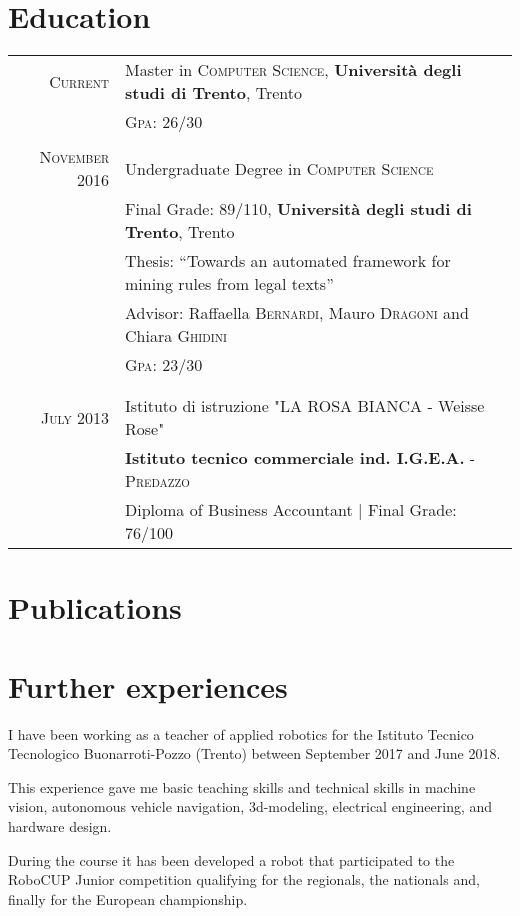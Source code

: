 \documentclass[a4paper,10pt]{article}
\begin{document}
\section{Education}
\begin{longtable}{rl}	
 \textsc{Current} & Master in \textsc{Computer Science}, \textbf{Università degli studi di Trento}, Trento\\
&\normalsize \textsc{Gpa}: 26/30{\hfill }\\&\\
\textsc{November} 2016 & Undergraduate Degree in \textsc{Computer Science} \\& Final Grade: 89/110, \normalsize\textbf{Università degli studi di Trento}, Trento\\
& Thesis: ``Towards an automated framework for mining rules from legal texts'' \\
&\small Advisor: Raffaella \textsc{Bernardi}, Mauro \textsc{Dragoni} and Chiara \textsc{Ghidini}\\
&\normalsize \textsc{Gpa}: 23/30{\hfill}\\&\\\\
\textsc{July} 2013& Istituto di istruzione "\textsc{LA ROSA BIANCA} - Weisse Rose"\\
& \textbf{Istituto tecnico commerciale ind. I.G.E.A.} - \textsc{Predazzo}\\
& Diploma of Business Accountant | Final Grade: 76/100
\end{longtable}

\section{Publications}
\nocite{*}
\printbibliography[heading=none]

\section{Further experiences}


I have been working as a teacher of applied robotics for the Istituto Tecnico Tecnologico Buonarroti-Pozzo (Trento) between September 2017 and June 2018. 

This experience gave me basic teaching skills and technical skills in machine vision, autonomous vehicle navigation, 3d-modeling, electrical engineering, and hardware design.

During the course it has been developed a robot that participated to the RoboCUP Junior competition qualifying for the regionals, the nationals and, finally for the European championship.
\end{document}
